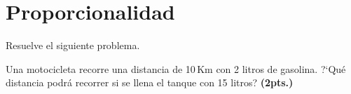\documentclass[11pt]{article}
\begin{document}
\section{Proporcionalidad} %
\label{sec:proporcionalidad}
Resuelve el siguiente problema.

Una motocicleta recorre una distancia de 10\,Km con 2 litros de gasolina.
?`Qu\'e distancia podr\'a recorrer si se llena el tanque con 15 litros? \hfill
\textbf{(2pts.)}

\end{document}
